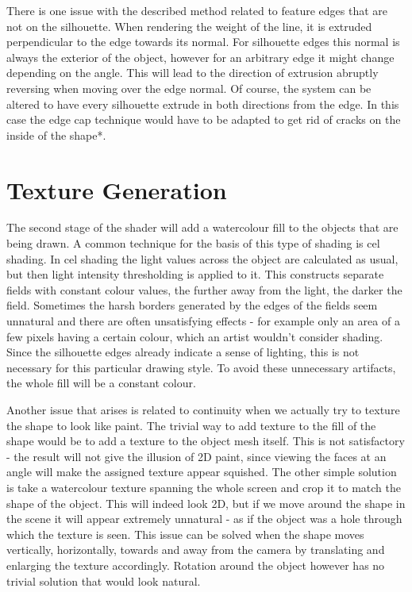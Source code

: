 \documentclass[a4paper, 12pt]{article}
\begin{document}
There is one issue with the described method related to feature edges that are not on the silhouette. When rendering the weight of the line, it is extruded perpendicular to the edge towards its normal. For silhouette edges this normal is always the exterior of the object, however for an arbitrary edge it might change depending on the angle. This will lead to the direction of extrusion abruptly reversing when moving over the edge normal. Of course, the system can be altered to have every silhouette extrude in both directions from the edge. In this case the edge cap technique would have to be adapted to get rid of cracks on the inside of the shape*.



\section{Texture Generation}

The second stage of the shader will add a watercolour fill to the objects that are being drawn. A common technique for the basis of this type of shading is cel shading. In cel shading the light values across the object are calculated as usual, but then light intensity thresholding is applied to it. This constructs separate fields with constant colour values, the further away from the light, the darker the field. Sometimes the harsh borders generated by the edges of the fields seem unnatural and there are often unsatisfying effects - for example only an area of a few pixels having a certain colour, which an artist wouldn't consider shading. Since the silhouette edges already indicate a sense of lighting, this is not necessary for this particular drawing style. To avoid these unnecessary artifacts, the whole fill will be a constant colour.

Another issue that arises is related to continuity when we actually try to texture the shape to look like paint. The trivial way to add texture to the fill of the shape would be to add a texture to the object mesh itself. This is not satisfactory - the result will not give the illusion of 2D paint, since viewing the faces at an angle will make the assigned texture appear squished. The other simple solution is take a watercolour texture spanning the whole screen and crop it to match the shape of the object. This will indeed look 2D, but if we move around the shape in the scene it will appear extremely unnatural - as if the object was a hole through which the texture is seen. This issue can be solved when the shape moves vertically, horizontally, towards and away from the camera by translating and enlarging the texture accordingly. Rotation around the object however has no trivial solution that would look natural.
\end{document}
